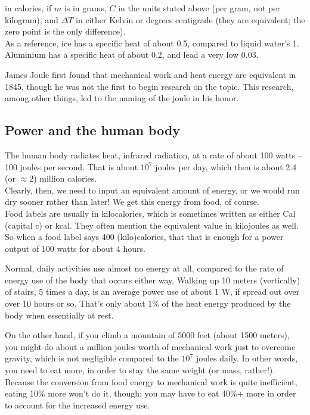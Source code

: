 in calories, if $m$ is in grams, $C$ in the units stated above (per gram, not per kilogram), and $\Delta T$ in either Kelvin or degrees centigrade (they are equivalent; the zero point is the only difference).\\
As a reference, ice has a specific heat of about 0.5, compared to liquid water's 1. Aluminium has a specific heat of about 0.2, and lead a very low 0.03.

James Joule first found that mechanical work and heat energy are equivalent in 1845, though he was not the first to begin research on the topic. This research, among other things, led to the naming of the joule in his honor.

\subsection{Power and the human body}

The human body radiates heat, infrared radiation, at a rate of about 100 watts -- 100 joules per second. That is about $10^7$ joules per day, which then is about 2.4 (or $\approx 2$) million calories.\\
Clearly, then, we need to input an equivalent amount of energy, or we would run dry sooner rather than later! We get this energy from food, of course.\\
Food labels are usually in kilocalories, which is sometimes written as either Cal (capital c) or kcal. They often mention the equivalent value in kilojoules as well.\\
So when a food label says 400 (kilo)calories, that that is enough for a power output of 100 watts for about 4 hours.

Normal, daily activities use almost no energy at all, compared to the rate of energy use of the body that occurs either way. Walking up 10 meters (vertically) of stairs, 5 times a day, is an average power use of about 1 W, if spread out over over 10 hours or so. That's only about 1\% of the heat energy produced by the body when essentially at rest.

On the other hand, if you climb a mountain of 5000 feet (about 1500 meters), you might do about a million joules worth of mechanical work just to overcome gravity, which is not negligible compared to the $10^7$ joules daily. In other words, you need to eat more, in order to stay the same weight (or mass, rather!).\\
Because the conversion from food energy to mechanical work is quite inefficient, eating 10\% more won't do it, though; you may have to eat 40\%+ more in order to account for the increased energy use.

